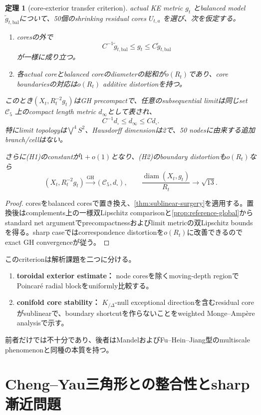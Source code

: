 \documentclass[11pt,a4paper]{ltjsarticle}
\newtheorem{theorem}{定理}[section]
\theoremstyle{definition}
\theoremstyle{remark}
\newcommand{\diam}{\operatorname{diam}}
\newcommand{\GH}{\mathrm{GH}}
\begin{document}
\begin{theorem}[core-exterior transfer criterion]\label{thm:core-exterior-transfer}
actual KE metric $g_t$ とbalanced model $\widetilde g_{t,\mathrm{bal}}$について、50個のshrinking residual cores $U_{t,a}$ を選び、次を仮定する。
\begin{enumerate}[label=(H\arabic*),leftmargin=3em]
\item coresの外で
\[
 C^{-1}\widetilde g_{t,\mathrm{bal}}
 \le g_t\le
 C\widetilde g_{t,\mathrm{bal}}
\]
が一様に成り立つ。
\item 各actual coreとbalanced coreのdiameterの総和が$o(R_t)$であり、core boundariesの対応は$o(R_t)$ additive distortionを持つ。
\end{enumerate}
このとき$(X_t,R_t^{-2}g_t)$はGH precompactで、任意のsubsequential limitは同じset $\mathcal C_5$ 上のcompact length metric $d_\infty$として表され、
\[
 C^{-1}d_\square\le d_\infty\le Cd_\square.
\]
特にlimit topologyは$\bigvee^4S^2$、Hausdorff dimensionは2で、50 nodesに由来する追加branch/cellはない。

さらに(H1)のconstantが$1+o(1)$となり、(H2)のboundary distortionも$o(R_t)$なら
\[
 (X_t,R_t^{-2}g_t)\xrightarrow{\GH}(\mathcal C_5,d_\square),
 \qquad \frac{\diam(X_t,g_t)}{R_t}\to\sqrt{13}.
\]
\end{theorem}

\begin{proof}
coresをbalanced coresで置き換え、\cref{thm:sublinear-surgery}を適用する。置換後はcomplements上の一様双Lipschitz comparisonと\cref{prop:reference-global}からstandard net argumentでprecompactnessおよびlimit metricの双Lipschitz boundsを得る。sharp caseではcorrespondence distortionを$o(R_t)$に改善できるのでexact GH convergenceが従う。
\end{proof}

このcriterionは解析課題を二つに分ける。
\begin{enumerate}[label=(A\arabic*),leftmargin=3em]
\item \textbf{toroidal exterior estimate：} node coresを除くmoving-depth regionでPoincaré radial blockをuniformly比較する。
\item \textbf{conifold core stability：} $K_{/\Delta}$-null exceptional directionを含むresidual coreがsublinearで、boundary shortcutを作らないことをweighted Monge--Ampère analysisで示す。
\end{enumerate}
前者だけでは不十分であり、後者はMandelおよびFu--Hein--Jiang型のmultiscale phenomenonと同種の本質を持つ。

\section{Cheng--Yau三角形との整合性とsharp漸近問題}
\end{document}
